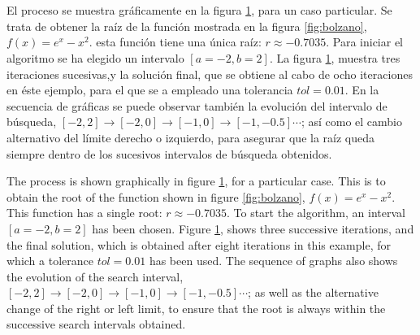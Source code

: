 \begin{paracol}{2}
\end{paracol} 

\begin{figure}
\centering
{} \qquad
{}\\
\qquad
{}\\

\label{fig:bisec}
\end{figure}

\begin{paracol}{2}
El proceso se muestra gráficamente en la figura \ref{fig:bisec}, para un caso particular. Se trata de obtener la raíz de la función mostrada en la figura \ref{fig:bolzano}, $f(x)=e^x-x^2$. esta función tiene una única raíz: $r\approx -0.7035$. Para iniciar el algoritmo se ha elegido un intervalo $[a=-2,b=2]$. La figura \ref{fig:bisec}, muestra tres iteraciones sucesivas,y la solución final, que se obtiene al cabo de ocho iteraciones en éste ejemplo, para el que se a empleado una tolerancia $tol=0.01$. En la secuencia de gráficas se puede observar también la evolución del intervalo de búsqueda, $[-2, 2]\rightarrow [-2, 0] \rightarrow [-1, 0] \rightarrow [-1, -0.5] \cdots$; así como el cambio alternativo del límite derecho o izquierdo, para asegurar que la raíz queda siempre dentro de los sucesivos intervalos de búsqueda obtenidos. 

\switchcolumn

The process is shown graphically in figure \ref{fig:bisec}, for a particular case. This is to obtain the root of the function shown in figure \ref{fig:bolzano}, $f(x)=e^x-x^2$. This function has a single root: $r\approx -0.7035$. To start the algorithm, an interval $[a=-2,b=2]$ has been chosen. Figure \ref{fig:bisec}, shows three successive iterations, and the final solution, which is obtained after eight iterations in this example, for which a tolerance $tol=0.01$ has been used. The sequence of graphs also shows the evolution of the search interval, $[-2, 2]\rightarrow [-2, 0] \rightarrow [-1, 0] \rightarrow [-1, -0.5] \cdots$; as well as the alternative change of the right or left limit, to ensure that the root is always within the successive search intervals obtained. 




\end{paracol}
